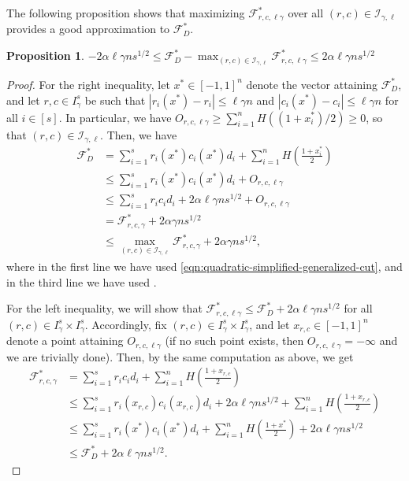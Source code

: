 \documentclass[final, 12pt]{colt2018}
\newcommand{\F}{\mathcal{F}}
\newcommand{\I}{\mathcal{I}}
\newtheorem{proposition}[theorem]{Proposition}
\theoremstyle{definition}
\theoremstyle{plain}
\begin{document}
The following proposition shows that maximizing $\F^*_{r,c,\ell \gamma}$ over all $(r,c)\in \I_{\gamma,\ell}$ provides a good approximation to $\F^{*}_{D}$. 
\begin{proposition}
\label{prop:approximating-by-finitely-many}
$-2\alpha\ell \gamma ns^{1/2} \leq \F^{*}_{D}-\max_{(r,c)\in \I_{\gamma,\ell}}\F^*_{r,c,\ell\gamma} \leq 2\alpha\ell \gamma ns^{1/2}$
\end{proposition}
\begin{proof}
For the right inequality, let $x^{*}\in [-1,1]^{n}$ denote the vector attaining $\F_{D}^{*}$, and let $r,c\in I_{\gamma}^{s}$
be such that $|r_{i}(x^*)-r_{i}|\leq\ell\gamma n$ and $|c_{i}(x^*)-c_{i}|\leq\ell\gamma n$
for all $i\in[s]$. In particular, we have $O_{r,c,\ell \gamma} \geq \sum_{i=1}^{n}H((1+x^*_i)/2) \geq 0$, so that $(r,c)\in \I_{\gamma,\ell}$.  Then, we have 
\begin{align*}
\F_{D}^{*} & =\sum_{i=1}^{s}r_{i}(x^*)c_{i}(x^*)d_{i}+\sum_{i=1}^{n}H\left(\frac{1+x^*_{i}}{2}\right)\\
 & \leq\sum_{i=1}^{s}r_{i}(x^*)c_{i}(x^*)d_{i}+O_{r,c,\ell \gamma}\\
 & \leq\sum_{i=1}^{s}r_{i}c_{i}d_{i}+2\alpha\ell \gamma ns^{1/2}+O_{r,c,\ell \gamma}\\
 & = \F^*_{r,c,\gamma}+2\alpha \gamma ns^{1/2}\\
 & \leq \max_{(r,c)\in \I_{\gamma,\ell}}\F^*_{r,c,\gamma}+2\alpha \gamma ns^{1/2},
\end{align*}
where in the first line we have used \cref{eqn:quadratic-simplified-generalized-cut}, and in the third line we have used .

For the left inequality, we will show that $\F^*_{r,c,\ell\gamma}\leq\F_{D}^{*}+2\alpha \ell\gamma ns^{1/2}$
for all $(r,c)\in I_{\gamma}^{s}\times I_{\gamma}^{s}$. Accordingly, fix $(r,c)\in I_{\gamma}^{s}\times I_{\gamma}^{s}$,
and let $x_{r,c}\in[-1,1]^{n}$ denote a point attaining $O_{r,c,\ell\gamma}$
(if no such point exists, then $O_{r,c,\ell\gamma}=-\infty$ and we are
trivially done). Then, by the same computation as above, we get 
\begin{align*}
\F^*_{r,c,\gamma} & =\sum_{i=1}^{s}r_{i}c_{i}d_{i}+\sum_{i=1}^{n}H\left(\frac{1+x_{r,c}}{2}\right)\\
 & \leq\sum_{i=1}^{s}r_{i}(x_{r,c})c_{i}(x_{r,c})d_{i}+2\alpha\ell \gamma ns^{1/2}+\sum_{i=1}^{n}H\left(\frac{1+x_{r,c}}{2}\right)\\
 & \leq\sum_{i=1}^{s}r_{i}(x^{*})c_{i}(x^{*})d_{i}+\sum_{i=1}^{n}H\left(\frac{1+x^{*}}{2}\right)+2\alpha\ell \gamma ns^{1/2}\\
 & \leq\F_{D}^{*}+2\alpha\ell \gamma ns^{1/2}.
\end{align*}
\end{proof}
\end{document}
